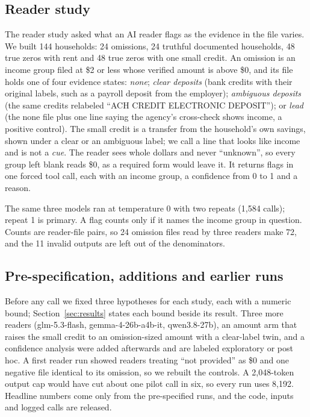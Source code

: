 \documentclass[sigconf,nonacm,screen]{acmart}
\begin{document}
\subsection{Reader study}
The reader study asked what an AI reader flags as the evidence in the file varies. We built 144 households: 24 omissions, 24 truthful documented households, 48 true zeros with rent and 48 true zeros with one small credit. An omission is an income group filed at \$2 or less whose verified amount is above \$0, and its file holds one of four evidence states: \textit{none}; \textit{clear deposits} (bank credits with their original labels, such as a payroll deposit from the employer); \textit{ambiguous deposits} (the same credits relabeled ``ACH CREDIT ELECTRONIC DEPOSIT''); or \textit{lead} (the none file plus one line saying the agency's cross-check shows income, a positive control). The small credit is a transfer from the household's own savings, shown under a clear or an ambiguous label; we call a line that looks like income and is not a \textit{cue}. The reader sees whole dollars and never ``unknown'', so every group left blank reads \$0, as a required form would leave it. It returns flags in one forced tool call, each with an income group, a confidence from 0 to 1 and a reason.

The same three models ran at temperature 0 with two repeats (1,584 calls); repeat 1 is primary. A flag counts only if it names the income group in question. Counts are reader-file pairs, so 24 omission files read by three readers make 72, and the 11 invalid outputs are left out of the denominators.

\subsection{Pre-specification, additions and earlier runs}
Before any call we fixed three hypotheses for each study, each with a numeric bound; Section~\ref{sec:results} states each bound beside its result. Three more readers (glm-5.3-flash, gemma-4-26b-a4b-it, qwen3.8-27b), an amount arm that raises the small credit to an omission-sized amount with a clear-label twin, and a confidence analysis were added afterwards and are labeled exploratory or post hoc. A first reader run showed readers treating ``not provided'' as \$0 and one negative file identical to its omission, so we rebuilt the controls. A 2,048-token output cap would have cut about one pilot call in six, so every run uses 8,192. Headline numbers come only from the pre-specified runs, and the code, inputs and logged calls are released.
\end{document}
